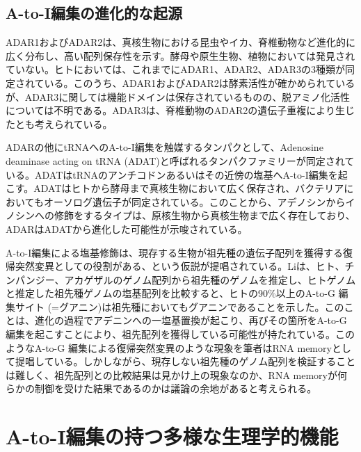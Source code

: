 \subsection{A-to-I編集の進化的な起源}
ADAR1およびADAR2は、真核生物における昆虫やイカ、脊椎動物など進化的に広く分布し、高い配列保存性を示す。酵母や原生生物、植物においては発見されていない。ヒトにおいては、これまでにADAR1、ADAR2、ADAR3の3種類が同定されている。このうち、ADAR1およびADAR2は酵素活性が確かめられているが、ADAR3に関しては機能ドメインは保存されているものの、脱アミノ化活性については不明である。ADAR3は、脊椎動物のADAR2の遺伝子重複により生じたとも考えられている。
\par
ADARの他にtRNAへのA-to-I編集を触媒するタンパクとして、Adenosine deaminase acting on tRNA (ADAT)と呼ばれるタンパクファミリーが同定されている。ADATはtRNAのアンチコドンあるいはその近傍の塩基へA-to-I編集を起こす。ADATはヒトから酵母まで真核生物において広く保存され、バクテリアにおいてもオーソログ遺伝子が同定されている。このことから、アデノシンからイノシンへの修飾をするタイプは、原核生物から真核生物まで広く存在しており、ADARはADATから進化した可能性が示唆されている。
\par
A-to-I編集による塩基修飾は、現存する生物が祖先種の遺伝子配列を獲得する復帰突然変異としての役割がある、という仮説が提唱されている。Liは、ヒト、チンパンジー、アカゲザルのゲノム配列から祖先種のゲノムを推定し、ヒトゲノムと推定した祖先種ゲノムの塩基配列を比較すると、ヒトの90\%以上のA-to-G 編集サイト (=グアニン)は祖先種においてもグアニンであることを示した。このことは、進化の過程でアデニンへの一塩基置換が起こり、再びその箇所をA-to-G 編集を起こすことにより、祖先配列を獲得している可能性が持たれている。このようなA-to-G 編集による復帰突然変異のような現象を筆者はRNA memoryとして提唱している。しかしながら、現存しない祖先種のゲノム配列を検証することは難しく、祖先配列との比較結果は見かけ上の現象なのか、RNA memoryが何らかの制御を受けた結果であるのかは議論の余地があると考えられる。

\section{A-to-I編集の持つ多様な生理学的機能}
